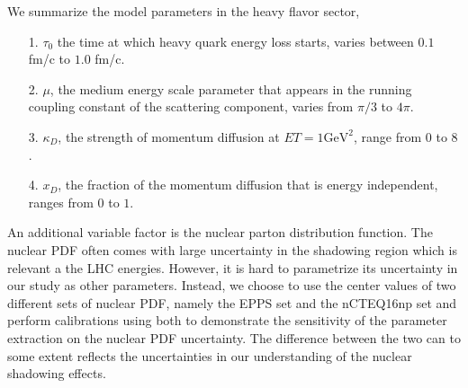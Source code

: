 \documentclass[aps, prc, reprint, amsmath, groupedaddress, nofootinbib]{revtex4-1}
\begin{document}
We summarize the model parameters in the heavy flavor sector,
\begin{itemize}
\item[1.] $\tau_0$ the time at which heavy quark energy loss starts, varies between $0.1$ fm/c to $1.0$ fm/c.
\item[2.] $\mu$, the medium energy scale parameter that appears in the running coupling constant of the scattering component, varies from $\pi/3$ to $4\pi$.
\item[3.] $\kappa_D$, the strength of momentum diffusion at $ET = 1 \textrm{GeV}^2$, range from $0$ to $8$.
\item[4.] $x_D$, the fraction of the momentum diffusion that is energy independent, ranges from $0$ to $1$.
\end{itemize}
An additional variable factor is the nuclear parton distribution function.
The nuclear PDF often comes with large uncertainty in the shadowing region which is relevant a the LHC energies.
However, it is hard to parametrize its uncertainty in our study as other parameters.
Instead, we choose to use the center values of two different sets of nuclear PDF, namely the EPPS set and the nCTEQ16np set and perform calibrations using both to demonstrate the sensitivity of the parameter extraction on the nuclear PDF uncertainty.
The difference between the two can to some extent reflects the uncertainties in our understanding of the nuclear shadowing effects.
\end{document}
